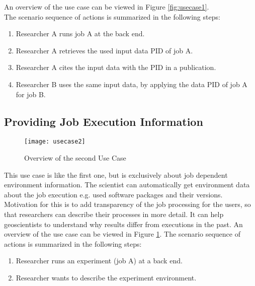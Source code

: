 \documentclass[draft,final]{vutinfth} %
\begin{document}
An overview of the use case can be viewed in Figure \ref{fig:usecase1}. \\

The scenario sequence of actions is summarized in the following steps: \\

\begin{enumerate}
	\item Researcher A runs job A at the back end.
	\item Researcher A retrieves the used input data PID of job A.
	\item Researcher A cites the input data with the PID in a publication.
	\item Researcher B uses the same input data, by applying the data PID of job A for job B.  
\end{enumerate}

\subsection{Providing Job Execution Information}\label{UseCase2}
\begin{figure}[h]
	\centering
	\texttt{[image: usecase2]}
	\caption{Overview of the second Use Case}
	\label{fig:usecase2} %
\end{figure}

This use case is like the first one, but is exclusively about job dependent environment information. The scientist can automatically get environment data about the job execution e.g. used software packages and their versions. Motivation for this is to add transparency of the job processing for the users, so that researchers can describe their processes in more detail. It can help geoscientists to understand why results differ from executions in the past. An overview of the use case can be viewed in Figure \ref{fig:usecase2}. 
The scenario sequence of actions is summarized in the following steps: \\
\begin{enumerate}
	\item Researcher runs an experiment (job A) at a back end.
	\item Researcher wants to describe the experiment environment.
\end{enumerate}
\end{document}
